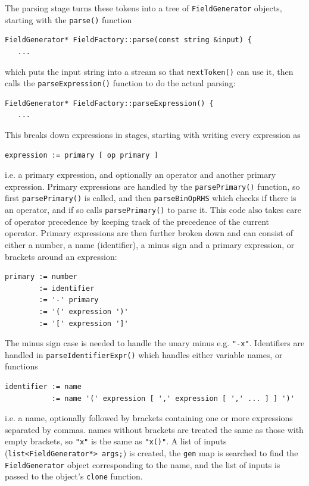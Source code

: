 \documentclass[12pt]{article}
\begin{document}
The parsing stage turns these tokens into a tree of \lstinline!FieldGenerator! objects, starting
with the \lstinline!parse()! function
\begin{lstlisting}[firstnumber=484]
FieldGenerator* FieldFactory::parse(const string &input) {
   ...
\end{lstlisting}
which puts the input string into a stream so that \lstinline!nextToken()! can use it, then
calls the \lstinline!parseExpression()! function to do the actual parsing:
\begin{lstlisting}[firstnumber=477]
FieldGenerator* FieldFactory::parseExpression() {
   ...
\end{lstlisting}

This breaks down expressions in stages, starting with writing every expression as
\begin{verbatim}
expression := primary [ op primary ]
\end{verbatim}
i.e. a primary expression, and optionally an operator and another primary expression. Primary
expressions are handled by the \lstinline!parsePrimary()! function, so first \lstinline!parsePrimary()! is called, 
and then \lstinline!parseBinOpRHS! which checks if there is an operator, and if so calls \lstinline!parsePrimary()! to
parse it. This code also takes care of operator precedence by keeping track of the precedence
of the current operator. Primary expressions are then further broken down and can consist of either
a number, a name (identifier), a minus sign and a primary expression, or brackets around an  expression:
\begin{verbatim}
primary := number
        := identifier
        := '-' primary
        := '(' expression ')'
        := '[' expression ']'
\end{verbatim}
The minus sign case is needed to handle the unary minus e.g. \lstinline!"-x"!. Identifiers are handled
in \lstinline!parseIdentifierExpr()! which handles either variable names, or functions
\begin{verbatim}
identifier := name
           := name '(' expression [ ',' expression [ ',' ... ] ] ')'
\end{verbatim}
i.e. a name, optionally followed by brackets containing one or more expressions separated by commas.
names without brackets are treated the same as those with empty brackets, so \lstinline!"x"! is the same
as \lstinline!"x()"!. A list of inputs (\lstinline!list<FieldGenerator*> args;!) is created, 
the \lstinline!gen! map is searched to find the \lstinline!FieldGenerator! object corresponding to the name,
and the list of inputs is passed to the object's \lstinline!clone! function.
\end{document}
